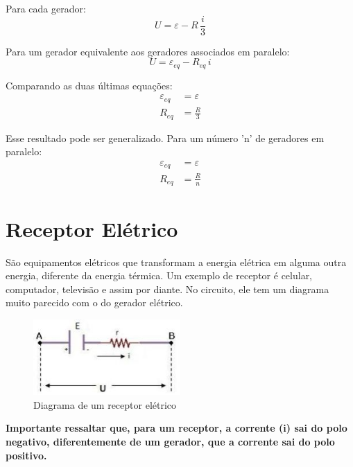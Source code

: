 \documentclass[12pt]{extarticle}
\newcommand{\<}{\langle}
\renewcommand{\>}{\rangle}
\theoremstyle{definition}
\begin{document}
Para cada gerador:
\begin{equation}
    U = \varepsilon - R\,\frac{i}{3}
\end{equation}

 Para um gerador equivalente aos geradores associados em paralelo:
\begin{equation}
    U = \varepsilon_{eq} - R_{eq}\,i
\end{equation}

Comparando as duas últimas equações:
\begin{equation}
    \boxed{\begin{split}
        \varepsilon_{eq} &= \varepsilon\\
        R_{eq} &= \frac{R}{3}
    \end{split}}
\end{equation}

Esse resultado pode ser generalizado. Para um número 'n' de geradores em paralelo:
\begin{equation}
    \boxed{\begin{split}
        \varepsilon_{eq} &= \varepsilon\\
        R_{eq} &= \frac{R}{n}
    \end{split}}
\end{equation}

\section{Receptor Elétrico}

São equipamentos elétricos que transformam a energia elétrica em alguma outra energia, diferente da energia térmica. Um exemplo de receptor é celular, computador, televisão e assim por diante. No circuito, ele tem um diagrama muito parecido com o do gerador elétrico.

\begin{figure}[H]
    \centering
    \includegraphics[width=0.5\textwidth]{receptor-eletrico.jpg}
    \caption{Diagrama de um receptor elétrico}
    \label{fig:receptor}
\end{figure}

\textbf{Importante ressaltar que, para um receptor, a corrente (i) sai do polo negativo, diferentemente de um gerador, que a corrente sai do polo positivo.}
\end{document}
